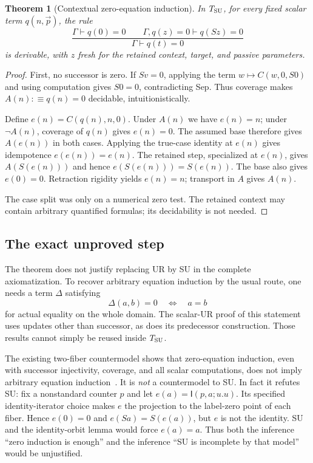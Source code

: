 \documentclass[11pt]{article}
\newtheorem{theorem}{Theorem}[section]
\theoremstyle{definition}
\newcommand{\Tsu}{T_{\rm SU}}
\newcommand{\I}{\mathsf I}
\newcommand{\G}{\Gamma}
\begin{document}
\begin{theorem}[Contextual zero-equation induction]
In $\Tsu$, for every fixed scalar term $q(n,\vec p)$, the rule
\[
 \frac{\G\vdash q(0)=0\qquad
       \G,q(z)=0\vdash q(Sz)=0}
      {\G\vdash q(t)=0}
\]
is derivable, with $z$ fresh for the retained context, target, and passive parameters.
\end{theorem}
\begin{proof}
First, no successor is zero. If $Sv=0$, applying the term $w\mapsto C(w,0,S0)$ and using computation gives $S0=0$, contradicting Sep. Thus coverage makes $A(n):\equiv q(n)=0$ decidable, intuitionistically.

Define $e(n)=C(q(n),n,0)$. Under $A(n)$ we have $e(n)=n$; under $\neg A(n)$, coverage of $q(n)$ gives $e(n)=0$. The assumed base therefore gives $A(e(n))$ in both cases. Applying the true-case identity at $e(n)$ gives idempotence $e(e(n))=e(n)$. The retained step, specialized at $e(n)$, gives $A(S(e(n)))$ and hence $e(S(e(n)))=S(e(n))$. The base also gives $e(0)=0$. Retraction rigidity yields $e(n)=n$; transport in $A$ gives $A(n)$.

The case split was only on a numerical zero test. The retained context may contain arbitrary quantified formulas; its decidability is not needed.
\end{proof}

\subsection{The exact unproved step}

The theorem does not justify replacing UR by SU in the complete axiomatization. To recover arbitrary equation induction by the usual route, one needs a term $\Delta$ satisfying
\[
 \Delta(a,b)=0\quad\Longleftrightarrow\quad a=b
\]
for actual equality on the whole domain. The scalar-UR proof of this statement uses updates other than successor, as does its predecessor construction. Those results cannot simply be reused inside $\Tsu$.

The existing two-fiber countermodel shows that zero-equation induction, even with successor injectivity, coverage, and all scalar computations, does not imply arbitrary equation induction~\cite{zeromodel}. It is \emph{not} a countermodel to SU. In fact it refutes SU: fix a nonstandard counter $p$ and let $e(a)=\I(p,a;u.u)$. Its specified identity-iterator choice makes $e$ the projection to the label-zero point of each fiber. Hence $e(0)=0$ and $e(Sa)=S(e(a))$, but $e$ is not the identity. SU and the identity-orbit lemma would force $e(a)=a$. Thus both the inference ``zero induction is enough'' and the inference ``SU is incomplete by that model'' would be unjustified.
\end{document}
